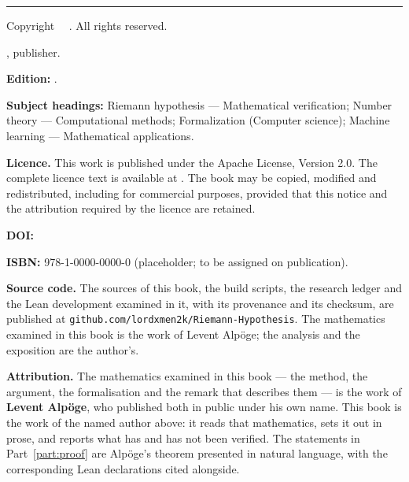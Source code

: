 \clearpage
\thispagestyle{plain}
\noindent{\sffamily\bfseries\color{txt}\bookTitle}\par
\noindent{\sffamily\small\color{txtdim}\bookSubtitle}\par
\vspace{14pt}
\noindent\rule{\textwidth}{0.4pt}\par
\vspace{10pt}
\noindent Copyright \textcopyright\ \bookCopyright\ \bookAuthor. All rights reserved.\par
\vspace{6pt}
\noindent \bookImprint, publisher.\par
\vspace{10pt}
\noindent\textbf{Edition:} \bookEdition.\par
\vspace{6pt}
\noindent\textbf{Subject headings:} Riemann hypothesis --- Mathematical
verification; Number theory --- Computational methods; Formalization
(Computer science); Machine learning --- Mathematical applications.\par
\vspace{10pt}
\noindent\textbf{Licence.} This work is published under the Apache License,
Version 2.0. The complete licence text is available at
\href{https://www.apache.org/licenses/LICENSE-2.0}{}.
The book may be copied, modified and redistributed, including for commercial
purposes, provided that this notice and the attribution required by the licence
are retained.\par
\vspace{10pt}
\noindent\textbf{DOI:} \href{https://doi.org/\bookDOI}{\texttt{\bookDOI}}\par
\vspace{10pt}
\noindent\textbf{ISBN:} 978-1-0000-0000-0 (placeholder; to be assigned on
publication).\par
\vspace{10pt}
\noindent\textbf{Source code.} The sources of this book, the build scripts, the
research ledger and the Lean development examined in it, with its provenance and
its checksum, are published at \texttt{github.com/lordxmen2k/Riemann-Hypothesis}.
The mathematics examined in this book is the work of Levent Alpöge; the analysis
and the exposition are the author's.\par
\vspace{10pt}
\noindent\textbf{Attribution.} The mathematics examined in this book --- the
method, the argument, the formalisation and the remark that describes them ---
is the work of \textbf{Levent Alpöge}, who published both in public under his
own name. This book is the work of the named author above: it reads that
mathematics, sets it out in prose, and reports what has and has not been
verified. The statements in Part~\ref{part:proof} are Alpöge's theorem presented
in natural language, with the corresponding Lean declarations cited alongside.

